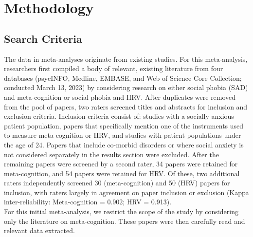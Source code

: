 \newpage
\chapter{Methodology}
\section*{Search Criteria}
The data in meta-analyses originate from existing studies.
For this meta-analysis, researchers first compiled a body of relevant, existing literature from four databases (psycINFO, Medline, EMBASE, and Web of Science Core Collection; conducted March 13, 2023) by considering research on either social phobia (SAD) and meta-cognition or social phobia and HRV.
After duplicates were removed from the pool of papers, two raters screened titles and abstracts for inclusion and exclusion criteria.
Inclusion criteria consist of: studies with a socially anxious patient population, papers that specifically mention one of the instruments used to measure meta-cognition or HRV, and studies with patient populations under the age of 24.
Papers that include co-morbid disorders or where social anxiety is not considered separately in the results section were excluded.
After the remaining papers were screened by a second rater, 34 papers were retained for meta-cognition, and 54 papers were retained for HRV.
Of these, two additional raters independently screened 30 (meta-cognition) and 50 (HRV) papers for inclusion, with raters largely in agreement on paper inclusion or exclusion (Kappa inter-reliability: Meta-cognition = 0.902; HRV = 0.913). \\
For this initial meta-analysis, we restrict the scope of the study by considering only the literature on meta-cognition. These papers were then carefully read and relevant data extracted.

